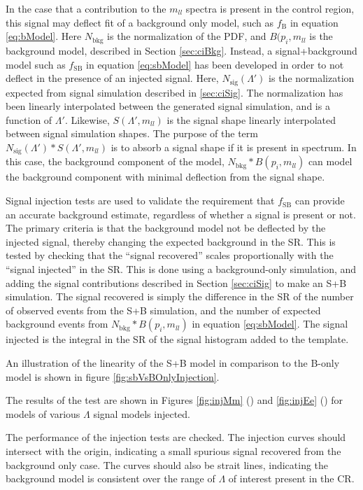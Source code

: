 In the case that a contribution to the $m_{ll}$ spectra is present in the control region, this signal may deflect fit of a background only model, such as $f_\text{B}$ in equation \ref{eq:bModel}. Here $N_\text{bkg}$ is the normalization of the PDF, and $B(p_i,m_{ll}$ is the background model, described in Section \ref{sec:ciBkg}. Instead, a signal+background model such as $f_\text{SB}$ in equation \ref{eq:sbModel} has been developed in order to not deflect in the presence of an injected signal. Here, $N_\text{sig}(\Lambda')$ is the normalization expected from signal simulation described in \ref{sec:ciSig}. The normalization has been linearly interpolated between the generated signal simulation, and is a function of $\Lambda'$. Likewise, $S(\Lambda',m_{ll})$ is the signal shape linearly interpolated between signal simulation shapes. The purpose of the term $N_\text{sig}(\Lambda')*S(\Lambda',m_{ll})$ is to absorb a signal shape if it is present in spectrum. In this case, the background component of the model, $N_\text{bkg}*B(p_i,m_{ll})$ can model the background component with minimal deflection from the signal shape.

Signal injection tests are used to validate the requirement that $f_\text{SB}$ can provide an accurate background estimate, regardless of whether a signal is present or not. The primary criteria is that the background model not be deflected by the injected signal, thereby changing the expected background in the SR. This is tested by checking that the ``signal recovered'' scales proportionally with the ``signal injected'' in the SR. This is done using a background-only simulation, and adding the signal contributions described in Section \ref{sec:ciSig} to make an S+B simulation. The signal recovered is simply the difference in the SR of the number of observed events from the S+B simulation, and the number of expected background events from $N_\text{bkg}*B(p_i,m_{ll})$ in equation \ref{eq:sbModel}. The signal injected is the integral in the SR of the signal histogram added to the template.

An illustration of the linearity of the S+B model in comparison to the B-only model is shown in figure \ref{fig:sbVsBOnlyInjection}.

The results of the test are shown in Figures \ref{fig:injMm} (\mm) and \ref{fig:injEe} (\ee) for models of various $\Lambda$ signal models injected. 

The performance of the injection tests are checked. The injection curves should intersect with the origin, indicating a small spurious signal recovered from the background only case. The curves should also be strait lines, indicating the background model is consistent over the range of $\Lambda$ of interest present in the CR.

